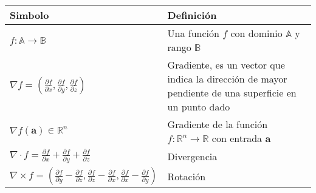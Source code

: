 \begin{table}[H]
    \begin{center}
        \begin{tabularx}{\textwidth}{|l|X|}
            \hline
            \textbf{Simbolo}                                                                                                                                                                                                                  & \textbf{Definición}                                                                                   \\
            \hline
            $ f: \mathbb{A} \rightarrow \mathbb{B} $                                                                                                                                                                                          & Una función $f$ con dominio $\mathbb{A}$ y rango $\mathbb{B}$                                         \\
            $ \nabla f = \left( \frac{\partial f}{\partial x}, \frac{\partial f}{\partial y}, \frac{\partial f}{\partial z} \right) $                                                                                                         & Gradiente, es un vector que indica la dirección de mayor pendiente de una superficie en un punto dado \\
            $ \nabla f(\mathbf{a}) \in \mathbb{R}^{n} $                                                                                                                                                                                       & Gradiente de la función $f: \mathbb{R}^{n} \rightarrow \mathbb{R}$ con entrada $\mathbf{a}$           \\
            $ \nabla \cdot f =  \frac{\partial f}{\partial x} + \frac{\partial f}{\partial y} + \frac{\partial f}{\partial z} $                                                                                                               & Divergencia                                                                                           \\
            $ \nabla \times f =  \left( \frac{\partial f}{\partial y} - \frac{\partial f}{\partial z}, \frac{\partial f}{\partial z} - \frac{\partial f}{\partial x}, \frac{\partial f}{\partial x} - \frac{\partial f}{\partial y}  \right)$ & Rotación                                                                                              \\

\end{tabularx}
\end{center}
\end{table}
